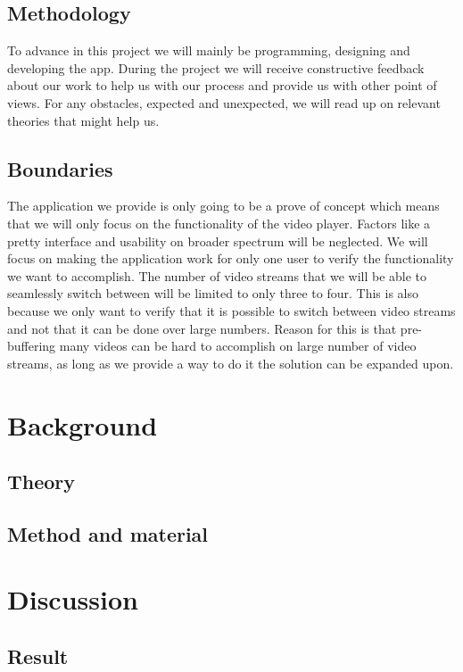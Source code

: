 \documentclass[9pt,a4paper]{acmproc}
\begin{document}
\subsection{Methodology}
To advance in this project we will mainly be programming, designing and developing the app. During the project we will receive constructive feedback about our work to help us with our process and provide us with other point of views. For any obstacles, expected and unexpected, we will read up on relevant theories that might help us.

\subsection{Boundaries}
The application we provide is only going to be a prove of concept which means that we will only focus on the functionality of the video player. Factors like a pretty interface and usability on broader spectrum will be neglected. We will focus on making the application work for only one user to verify the functionality we want to accomplish. The number of video streams that we will be able to seamlessly switch between will be limited to only three to four. This is also because we only want to verify that it is possible to switch between video streams and not that it can be done over large numbers. Reason for this is that pre-buffering many videos can be hard to accomplish on large number of video streams, as long as we provide a way to do it the solution can be expanded upon.

\clearpage

\section{Background}

\subsection{Theory}

\subsection{Method and material}

\clearpage

\section{Discussion}

\subsection{Result}
\end{document}
